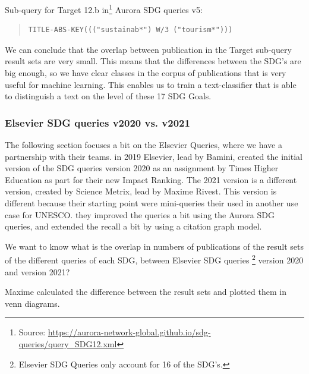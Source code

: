 \documentclass{article}
\begin{document}
Sub-query for Target 12.b in\footnote{ Source: \url{https://aurora-network-global.github.io/sdg-queries/query_SDG12.xml}} Aurora SDG queries v5:
\begin{quote}
\begin{verbatim}
TITLE-ABS-KEY((("sustainab*") W/3 ("tourism*")))
\end{verbatim}
\end{quote}

We can conclude that the overlap between publication in the Target sub-query  result sets are very small. This means that the differences between the SDG's are big enough, so we have clear classes in the corpus of publications that is very useful for machine learning. This enables us to train a text-classifier that is able to distinguish a text on the level of these 17 SDG Goals.


\subsubsection{Elsevier SDG queries v2020 vs. v2021}
The following section focuses a bit on the Elsevier Queries, where we have a partnership with their teams. in 2019 Elsevier, lead by Bamini, created the initial version of the SDG queries version 2020 as an assignment by Times Higher Education as  part for their new Impact Ranking. \cite{jayabalasingham_identifying_2019}
The 2021 version is a different version, created by Science Metrix, lead by Maxime Rivest. \cite{rivest_improving_2021} This version is different because their starting point were mini-queries their used in another use case for UNESCO. they improved the queries a bit using the Aurora SDG queries, and extended the recall a bit by using a citation graph model.


We want to know what is the overlap in numbers of publications of the result sets of the different queries of each SDG, between Elsevier SDG queries \footnote{Elsevier SDG Queries only account for 16 of the SDG's. } version 2020 and version 2021?

Maxime calculated the difference between the result sets and plotted them in venn diagrams.
\end{document}
